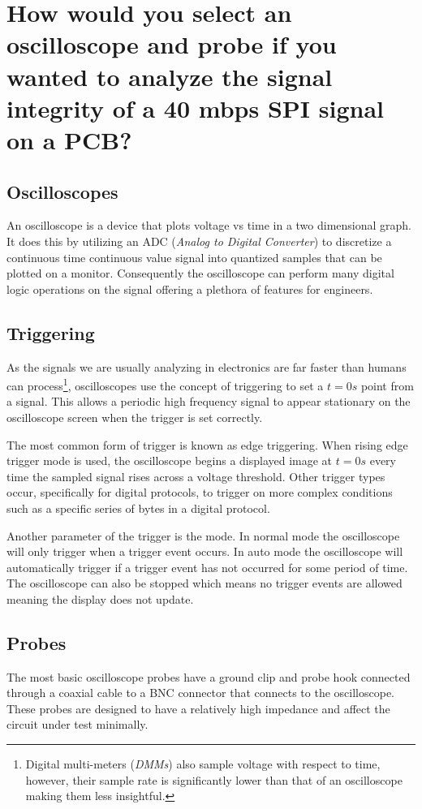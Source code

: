 \documentclass[main.tex]{subfiles}
\begin{document}
\section{How would you select an oscilloscope and probe if you wanted to analyze the signal integrity of a 40 mbps SPI signal on a PCB?}

\subsection{Oscilloscopes}
An oscilloscope is a device that plots voltage vs time in a two dimensional graph. It does this by utilizing an ADC (\textit{Analog to Digital Converter}) to discretize a continuous time continuous value signal into quantized samples that can be plotted on a monitor. Consequently the oscilloscope can perform many digital logic operations on the signal offering a plethora of features for engineers. 

\subsection{Triggering}
As the signals we are usually analyzing in electronics are far faster than humans can process\footnote{Digital multi-meters (\textit{DMMs}) also sample voltage with respect to time, however, their sample rate is significantly lower than that of an oscilloscope making them less insightful.}, oscilloscopes use the concept of triggering to set a $t=0s$ point from a signal. This allows a periodic high frequency signal to appear stationary on the oscilloscope screen when the trigger is set correctly. 

The most common form of trigger is known as edge triggering. When rising edge trigger mode is used, the oscilloscope begins a displayed image at $t=0s$ every time the sampled signal rises across a voltage threshold. Other trigger types occur, specifically for digital protocols, to trigger on more complex conditions such as a specific series of bytes in a digital protocol. 

Another parameter of the trigger is the mode. In normal mode the oscilloscope will only trigger when a trigger event occurs. In auto mode the oscilloscope will automatically trigger if a trigger event has not occurred for some period of time. The oscilloscope can also be stopped which means no trigger events are allowed meaning the display does not update.  

\subsection{Probes}
The most basic oscilloscope probes have a ground clip and probe hook connected through a coaxial cable to a BNC connector that connects to the oscilloscope. These probes are designed to have a relatively high impedance and affect the circuit under test minimally. 
\end{document}
